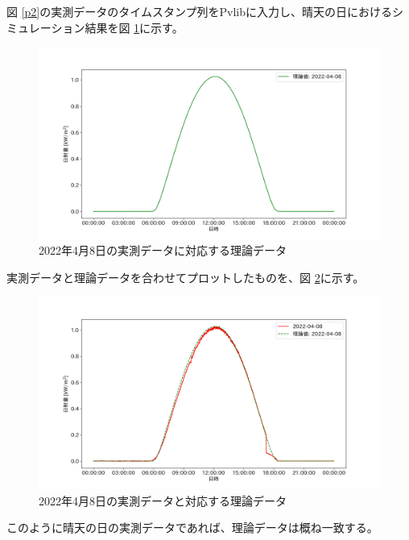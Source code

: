 \documentclass[a4j,12pt,]{jarticle}
\begin{document}
図 \ref{p2}の実測データのタイムスタンプ列をPvlibに入力し、晴天の日におけるシミュレーション結果を図 \ref{p3}に示す。

\begin{figure}[H]
  \begin{center}
    \includegraphics[width=160mm]{theoretical.png}
    \caption{2022年4月8日の実測データに対応する理論データ}
    \label{p3}
  \end{center}
\end{figure}

実測データと理論データを合わせてプロットしたものを、図 \ref{p4}に示す。

\begin{figure}[H]
  \begin{center}
    \includegraphics[width=160mm]{real_and_theoretical.png}
    \caption{2022年4月8日の実測データと対応する理論データ}
    \label{p4}
  \end{center}
\end{figure}

このように晴天の日の実測データであれば、理論データは概ね一致する。
\end{document}
